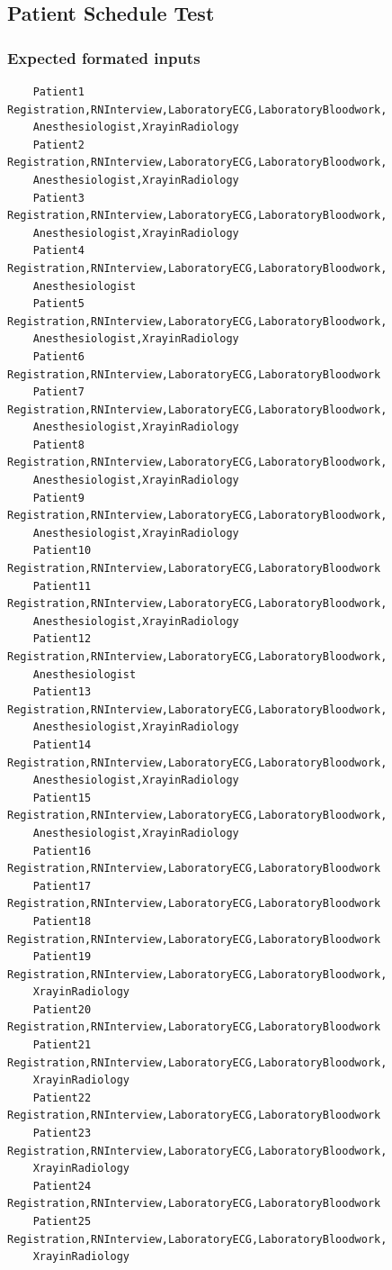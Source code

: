 \documentclass[12pt]{article}
\begin{document}
\subsection{Patient Schedule Test} \label{patientschedule}
\subsubsection{Expected formated inputs}
	\begin{verbatim}
	Patient1 Registration,RNInterview,LaboratoryECG,LaboratoryBloodwork,
	Anesthesiologist,XrayinRadiology
	Patient2 Registration,RNInterview,LaboratoryECG,LaboratoryBloodwork,
	Anesthesiologist,XrayinRadiology
	Patient3 Registration,RNInterview,LaboratoryECG,LaboratoryBloodwork,
	Anesthesiologist,XrayinRadiology
	Patient4 Registration,RNInterview,LaboratoryECG,LaboratoryBloodwork,
	Anesthesiologist
	Patient5 Registration,RNInterview,LaboratoryECG,LaboratoryBloodwork,
	Anesthesiologist,XrayinRadiology
	Patient6 Registration,RNInterview,LaboratoryECG,LaboratoryBloodwork
	Patient7 Registration,RNInterview,LaboratoryECG,LaboratoryBloodwork,
	Anesthesiologist,XrayinRadiology
	Patient8 Registration,RNInterview,LaboratoryECG,LaboratoryBloodwork,
	Anesthesiologist,XrayinRadiology
	Patient9 Registration,RNInterview,LaboratoryECG,LaboratoryBloodwork,
	Anesthesiologist,XrayinRadiology
	Patient10 Registration,RNInterview,LaboratoryECG,LaboratoryBloodwork
	Patient11 Registration,RNInterview,LaboratoryECG,LaboratoryBloodwork,
	Anesthesiologist,XrayinRadiology
	Patient12 Registration,RNInterview,LaboratoryECG,LaboratoryBloodwork,
	Anesthesiologist
	Patient13 Registration,RNInterview,LaboratoryECG,LaboratoryBloodwork,
	Anesthesiologist,XrayinRadiology
	Patient14 Registration,RNInterview,LaboratoryECG,LaboratoryBloodwork,
	Anesthesiologist,XrayinRadiology
	Patient15 Registration,RNInterview,LaboratoryECG,LaboratoryBloodwork,
	Anesthesiologist,XrayinRadiology
	Patient16 Registration,RNInterview,LaboratoryECG,LaboratoryBloodwork
	Patient17 Registration,RNInterview,LaboratoryECG,LaboratoryBloodwork
	Patient18 Registration,RNInterview,LaboratoryECG,LaboratoryBloodwork
	Patient19 Registration,RNInterview,LaboratoryECG,LaboratoryBloodwork,
	XrayinRadiology
	Patient20 Registration,RNInterview,LaboratoryECG,LaboratoryBloodwork
	Patient21 Registration,RNInterview,LaboratoryECG,LaboratoryBloodwork,
	XrayinRadiology
	Patient22 Registration,RNInterview,LaboratoryECG,LaboratoryBloodwork
	Patient23 Registration,RNInterview,LaboratoryECG,LaboratoryBloodwork,
	XrayinRadiology
	Patient24 Registration,RNInterview,LaboratoryECG,LaboratoryBloodwork
	Patient25 Registration,RNInterview,LaboratoryECG,LaboratoryBloodwork,
	XrayinRadiology
	\end{verbatim}
	
\end{document}
